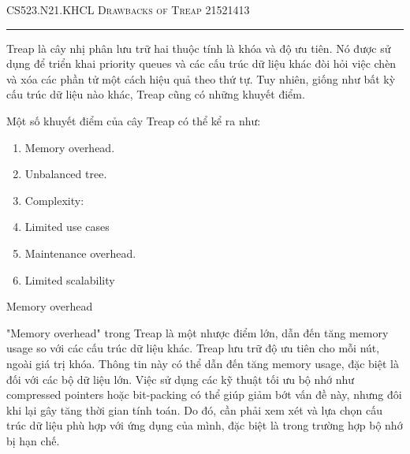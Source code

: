 \documentclass[12pt]{amsart}
\begin{document}
\thispagestyle{empty}

{\scshape CS523.N21.KHCL} \hfill {\scshape \large Drawbacks of Treap} \hfill {\scshape 21521413}
 
\smallskip

\hrule

\bigskip
Treap là cây nhị phân lưu trữ hai thuộc tính là khóa và độ ưu tiên. Nó được sử dụng để triển khai priority queues và các cấu trúc dữ liệu khác đòi hỏi việc chèn và xóa các phần tử một cách hiệu quả theo thứ tự. Tuy nhiên, giống như bất kỳ cấu trúc dữ liệu nào khác, Treap cũng có những khuyết điểm. 
\bigskip

\bigskip

Một số khuyết điểm của cây Treap có thể kể ra như:
\begin{enumerate}

\item  Memory overhead.

\medskip

\item  Unbalanced tree.

\medskip

\item  Complexity:

\medskip

\item  Limited use cases

\medskip

\item  Maintenance overhead.

\medskip

\item Limited scalability

\medskip

\end{enumerate}

\bigskip

\bigskip

\begin{section}{Memory overhead}

    "Memory overhead" trong Treap là một nhược điểm lớn, dẫn đến tăng memory usage so với các cấu trúc dữ liệu khác. Treap lưu trữ độ ưu tiên cho mỗi nút, ngoài giá trị khóa. Thông tin này có thể dẫn đến tăng memory usage, đặc biệt là đối với các bộ dữ liệu lớn. Việc sử dụng các kỹ thuật tối ưu bộ nhớ như compressed pointers hoặc bit-packing có thể giúp giảm bớt vấn đề này, nhưng đôi khi lại gây tăng thời gian tính toán. Do đó, cần phải xem xét và lựa chọn cấu trúc dữ liệu phù hợp với ứng dụng của mình, đặc biệt là trong trường hợp bộ nhớ bị hạn chế.

\end{section}
\end{document}
